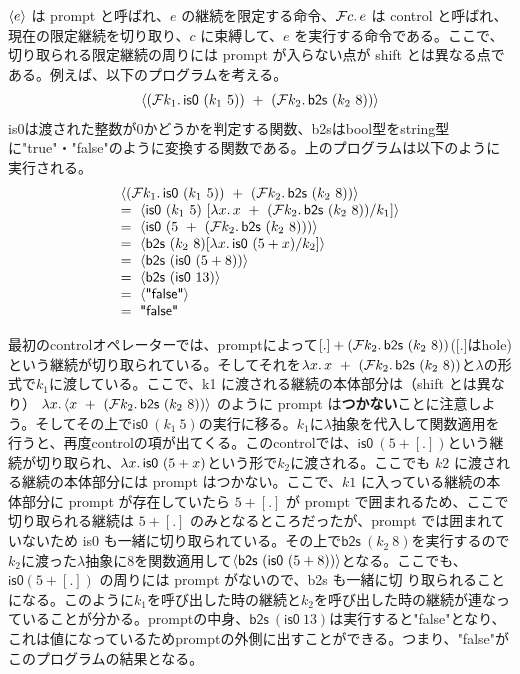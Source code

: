 \documentclass[japanese,draft]{jssst_ppl} %
\begin{document}
$\langle{e}\rangle$ は prompt と呼ばれ、$e$ の継続を限定する命令、${\cal F}{c}.\,{e}$ は control と呼ばれ、現在の限定継続を切り取り、$c$ に束縛して、$e$ を実行する命令である。ここで、切り取られる限定継続の周りには prompt が入らない点が shift とは異なる点である。例えば、以下のプログラム\cite{FSCD2021}を考える。
\[
\begin{array}{c}
  \Prompt{(\Control{k_1}{\textsf{is0}\ (k_1\ 5)})\ +\ (\Control{k_2}{\textsf{b2s}\ (k_2\ 8)})}
\end{array}
\]
\textsf{is0}は渡された整数が0かどうかを判定する関数、\textsf{b2s}はbool型をstring型に\textsf{"true"}・\textsf{"false"}のように変換する関数である。上のプログラムは以下のように実行される。
\[
\begin{array}{l}
  \Prompt{(\Control{k_1}{\textsf{is0}\ (k_1\ 5)})\ +\ (\Control{k_2}{\textsf{b2s}\ (k_2\ 8)})}\\
  =\ \Prompt{\textsf{is0}\ (k_1\ 5)\ [\Lam{x}{x}\ +\ (\Control{k_2}{\textsf{b2s}\ (k_2\ 8)})/k_1]}\\
  =\ \Prompt{\textsf{is0}\ (5\ +\ (\Control{k_2}{\textsf{b2s}\ (k_2\ 8)}))}\\
  =\ \Prompt{\textsf{b2s}\ (k_2\ 8)[\Lam{x}{\textsf{is0}\ (5 + x)}/k_2]}\\
  =\ \Prompt{\textsf{b2s}\ (\textsf{is0}\ (5+8))}\\
  =\ \Prompt{\textsf{b2s}\ (\textsf{is0}\ 13)}\\
  =\ \Prompt{\textsf{"false"}}\\
  =\ \textsf{"false"}
\end{array}
\]

最初のcontrolオペレーターでは、promptによって$[.]+(\Control{k_2}{\textsf{b2s}\ (k_2\ 8)})$([.]はhole)という継続が切り取られている。そしてそれを$\Lam{x}{x}\ +\ (\Control{k_2}{\textsf{b2s}\ (k_2\ 8)})$と$\lambda$の形式で$k_1$に渡している。ここで、k1 に渡される継続の本体部分は（shift とは異なり）
  $\Lam{x}{\langle x}\ +\ (\Control{k_2}{\textsf{b2s}\ (k_2\ 8)})\rangle$ のように prompt は\textbf{つかない}ことに注意しよう。そしてその上で$\textsf{is0}\ (k_1\ 5)$の実行に移る。$k_1$に$\lambda$抽象を代入して関数適用を行うと、再度controlの項が出てくる。このcontrolでは、$\textsf{is0}\ (5 + [.])$という継続が切り取られ、$\lambda{x}.\,{\textsf{is0}\ (5 + x)}$という形で$k_2$に渡される。ここでも $k2$ に渡される継続の本体部分には prompt はつかない。ここで、$k1$ に入っている継続の本体部分に prompt が存在していたら $5+[.]$ が prompt で囲まれるため、ここで切り取られる継続は $5+[.]$ のみとなるところだったが、prompt では囲まれていないため \textsf{is0} も一緒に切り取られている。その上で$\textsf{b2s}\ (k_2\ 8)$を実行するので$k_2$に渡った$\lambda$抽象に8を関数適用して$\Prompt{\textsf{b2s}\ (\textsf{is0}\ (5+8))}$となる。ここでも、$\textsf{is0} (5 + [.])$ の周りには prompt がないので、\textsf{b2s} も一緒に切
り取られることになる。このように$k_1$を呼び出した時の継続と$k_2$を呼び出した時の継続が連なっていることが分かる。promptの中身、$\textsf{b2s}\ (\textsf{is0}\ 13)$は実行すると\textsf{"false"}となり、これは値になっているためpromptの外側に出すことができる。つまり、\textsf{"false"}がこのプログラムの結果となる。
\end{document}
